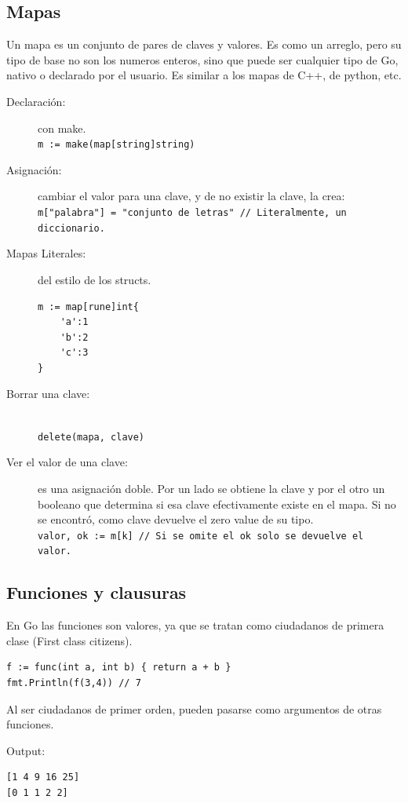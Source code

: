 \documentclass{article}
\begin{document}
\subsection{Mapas}
Un mapa es un conjunto de pares de claves y valores. Es como un arreglo, pero su tipo de base no son los numeros enteros, sino que puede ser cualquier tipo de Go, nativo o declarado por el usuario. Es similar a los mapas de C++, de python, etc.
\begin{description}
	\item[Declaración:] con make. \\
		\lstinline|m := make(map[string]string)|
	\item[Asignación:] cambiar el valor para una clave, y de no existir la clave, la crea: \\
		\lstinline|m["palabra"] = "conjunto de letras" // Literalmente, un diccionario.|
	\item[Mapas Literales:] del estilo de los structs.
\begin{lstlisting}[caption = metal]
m := map[rune]int{
	'a':1
	'b':2
	'c':3
}
\end{lstlisting}
	\item[Borrar una clave:] \hfill \\
		\lstinline|delete(mapa, clave)|
	\item[Ver el valor de una clave:] es una asignación doble. Por un lado se obtiene la clave y por el otro un booleano que determina si esa clave efectivamente existe en el mapa. Si no se encontró, como clave devuelve el zero value de su tipo. \\
		\lstinline|valor, ok := m[k] // Si se omite el ok solo se devuelve el valor.|
\end{description}

\subsection{Funciones y clausuras}
En Go las funciones son valores, ya que se tratan como ciudadanos de primera clase (First class citizens).
\begin{lstlisting}[caption = asignación y uso.]
f := func(int a, int b) { return a + b }
fmt.Println(f(3,4)) // 7
\end{lstlisting}
Al ser ciudadanos de primer orden, pueden pasarse como argumentos de otras funciones.

Output: 
\begin{verbatim}
[1 4 9 16 25]
[0 1 1 2 2]
\end{verbatim}
\end{document}
